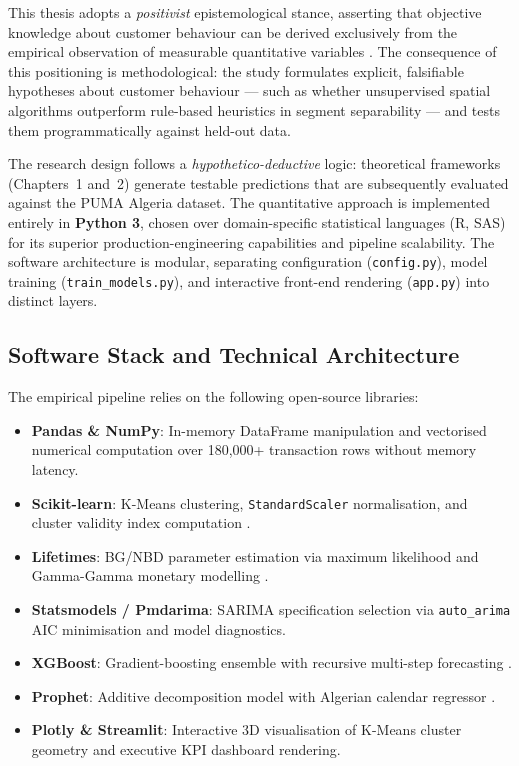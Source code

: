 This thesis adopts a \textit{positivist} epistemological stance, asserting that objective knowledge about customer behaviour can be derived exclusively from the empirical observation of measurable quantitative variables \cite{james2013introduction}. The consequence of this positioning is methodological: the study formulates explicit, falsifiable hypotheses about customer behaviour — such as whether unsupervised spatial algorithms outperform rule-based heuristics in segment separability — and tests them programmatically against held-out data.

The research design follows a \textit{hypothetico-deductive} logic: theoretical frameworks (Chapters~1 and~2) generate testable predictions that are subsequently evaluated against the PUMA Algeria dataset. The quantitative approach is implemented entirely in \textbf{Python 3}, chosen over domain-specific statistical languages (R, SAS) for its superior production-engineering capabilities and pipeline scalability. The software architecture is modular, separating configuration (\texttt{config.py}), model training (\texttt{train\_models.py}), and interactive front-end rendering (\texttt{app.py}) into distinct layers.

\subsection{Software Stack and Technical Architecture}

The empirical pipeline relies on the following open-source libraries:

\begin{itemize}[noitemsep]
    \item \textbf{Pandas \& NumPy}: In-memory DataFrame manipulation and vectorised numerical computation over 180,000+ transaction rows without memory latency.
    \item \textbf{Scikit-learn}: K-Means clustering, \texttt{StandardScaler} normalisation, and cluster validity index computation \cite{james2013introduction}.
    \item \textbf{Lifetimes}: BG/NBD parameter estimation via maximum likelihood and Gamma-Gamma monetary modelling \cite{CLVToolsExplanation2021}.
    \item \textbf{Statsmodels / Pmdarima}: SARIMA specification selection via \texttt{auto\_arima} AIC minimisation and model diagnostics.
    \item \textbf{XGBoost}: Gradient-boosting ensemble with recursive multi-step forecasting \cite{ChenGuestrin2016}.
    \item \textbf{Prophet}: Additive decomposition model with Algerian calendar regressor \cite{TaylorLetham2018}.
    \item \textbf{Plotly \& Streamlit}: Interactive 3D visualisation of K-Means cluster geometry and executive KPI dashboard rendering.
\end{itemize}

